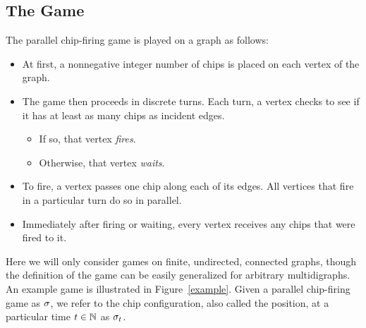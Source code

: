 \subsection*{The Game}
The parallel chip-firing game is played on a graph as follows:
\begin{itemize}
\item At first, a nonnegative integer number of chips is placed on each vertex
  of the graph.
\item The game then proceeds in discrete turns. Each turn, a vertex checks to
  see if it has at least as many chips as incident edges.
\begin{itemize}
\item If so, that vertex \emph{fires}.
\item Otherwise, that vertex \emph{waits}.
\end{itemize}
\item To fire, a vertex passes one chip along each of its edges. All vertices
  that fire in a particular turn do so in parallel.
\item Immediately after firing or waiting, every vertex receives any chips that
  were fired to it.
\end{itemize}
Here we will only consider games on finite, undirected, connected graphs,
though the definition of the game can be easily generalized for arbitrary
multidigraphs. An example game is illustrated in Figure~\ref{example}. Given a
parallel chip-firing game as $\sigma$, we refer to the chip configuration, also called the position, at a
particular time $t \in \mathbb{N}$ as $\sigma_{t}$.
